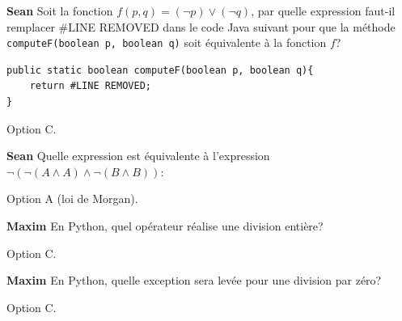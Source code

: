 \begin{Exercice}[10 minutes]\textbf{Sean}
 Soit la fonction $f(p,q) = (\neg p) \vee (\neg q)$, par quelle expression faut-il remplacer \#LINE REMOVED dans le code Java suivant pour que la méthode \texttt{computeF(boolean p, boolean q)} soit équivalente à la fonction $f$?
    \begin{lstlisting}[style=javastyle]
public static boolean computeF(boolean p, boolean q){
    return #LINE REMOVED;
}\end{lstlisting} 

\begin{solution}
Option C.
\end{solution}

\end{Exercice}

\begin{Exercice}[10 minutes]\textbf{Sean}
Quelle expression est équivalente à l'expression $\neg( \neg (A \wedge A) \wedge \neg(B \wedge B))$:


\begin{solution}
Option A (loi de Morgan). 
\end{solution}
\end{Exercice}

\begin{Exercice}[10 minutes]\textbf{Maxim}
En Python, quel opérateur réalise une division entière?


\begin{solution}
Option C. 
\end{solution}
\end{Exercice}

\begin{Exercice}[5 minutes]\textbf{Maxim}
En Python, quelle exception sera levée pour une division par zéro?
\begin{solution}
Option C. 
\end{solution}
\end{Exercice}

